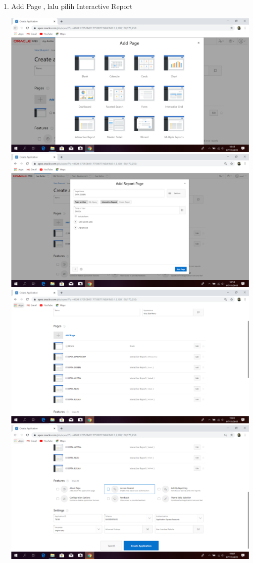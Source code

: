 \documentclass{article}
\begin{document}
\begin{enumerate}
\begin{enumerate}
\begin{center}
    \end{center}
    \item Add Page , lalu pilih Interactive Report
     \begin{center}
    \includegraphics[width=.8\textwidth]{figure/38.PNG}
     \includegraphics[width=.8\textwidth]{figure/39.PNG}
      \includegraphics[width=.8\textwidth]{figure/40.PNG}
       \includegraphics[width=.8\textwidth]{figure/41.PNG}

\end{center}
\end{enumerate}
\end{enumerate}
\end{document}

